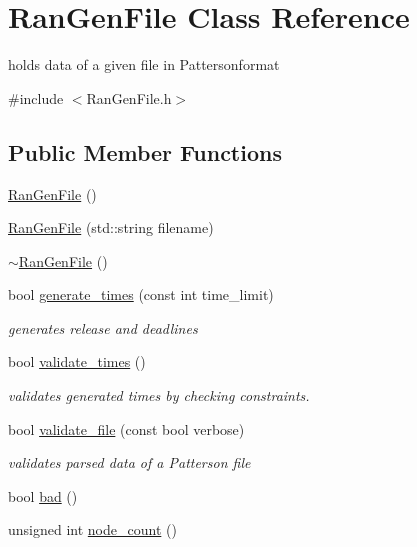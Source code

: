 \hypertarget{class_ran_gen_file}{}\section{Ran\+Gen\+File Class Reference}
\label{class_ran_gen_file}


holds data of a given file in Pattersonformat  




{\ttfamily \#include $<$Ran\+Gen\+File.\+h$>$}

\subsection*{Public Member Functions}
\begin{DoxyCompactItemize}
\item 
\hyperlink{class_ran_gen_file_a616250ded3614cb486416df28330ae3d}{Ran\+Gen\+File} ()
\item 
\hyperlink{class_ran_gen_file_aeb77381893510cd972d85938b7e9af45}{Ran\+Gen\+File} (std\+::string filename)
\item 
\hyperlink{class_ran_gen_file_addd0bb75a18973a0bafd74b17aebe70f}{$\sim$\+Ran\+Gen\+File} ()
\item 
bool \hyperlink{class_ran_gen_file_aa8a770159a90eba229478ee07071b45b}{generate\+\_\+times} (const int time\+\_\+limit)
\begin{DoxyCompactList}\small\item\em generates release and deadlines \end{DoxyCompactList}\item 
bool \hyperlink{class_ran_gen_file_a20c3fff77f5ae8fa13a124cc45cee3cf}{validate\+\_\+times} ()
\begin{DoxyCompactList}\small\item\em validates generated times by checking constraints. \end{DoxyCompactList}\item 
bool \hyperlink{class_ran_gen_file_a9cf7705e31a34a984534e62c0fd8df71}{validate\+\_\+file} (const bool verbose)
\begin{DoxyCompactList}\small\item\em validates parsed data of a Patterson file \end{DoxyCompactList}\item 
bool \hyperlink{class_ran_gen_file_a00cc0c567886980a7059c2780a1d4b65}{bad} ()
\item 
unsigned int \hyperlink{class_ran_gen_file_aa7092846cefbdd9f3334d63da7adc21c}{node\+\_\+count} ()

\end{DoxyCompactItemize}
